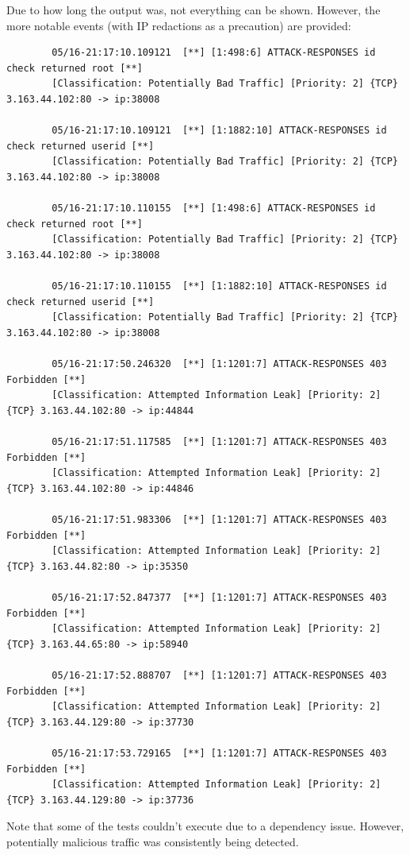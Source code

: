 \documentclass[titlepage]{article}
\begin{document}
        Due to how long the output was, not everything can be shown. However,
        the more notable events (with IP redactions as a precaution) are
        provided:
        \begin{verbatim}
        05/16-21:17:10.109121  [**] [1:498:6] ATTACK-RESPONSES id check returned root [**] 
        [Classification: Potentially Bad Traffic] [Priority: 2] {TCP} 3.163.44.102:80 -> ip:38008

        05/16-21:17:10.109121  [**] [1:1882:10] ATTACK-RESPONSES id check returned userid [**] 
        [Classification: Potentially Bad Traffic] [Priority: 2] {TCP} 3.163.44.102:80 -> ip:38008

        05/16-21:17:10.110155  [**] [1:498:6] ATTACK-RESPONSES id check returned root [**] 
        [Classification: Potentially Bad Traffic] [Priority: 2] {TCP} 3.163.44.102:80 -> ip:38008

        05/16-21:17:10.110155  [**] [1:1882:10] ATTACK-RESPONSES id check returned userid [**] 
        [Classification: Potentially Bad Traffic] [Priority: 2] {TCP} 3.163.44.102:80 -> ip:38008

        05/16-21:17:50.246320  [**] [1:1201:7] ATTACK-RESPONSES 403 Forbidden [**] 
        [Classification: Attempted Information Leak] [Priority: 2] {TCP} 3.163.44.102:80 -> ip:44844

        05/16-21:17:51.117585  [**] [1:1201:7] ATTACK-RESPONSES 403 Forbidden [**] 
        [Classification: Attempted Information Leak] [Priority: 2] {TCP} 3.163.44.102:80 -> ip:44846

        05/16-21:17:51.983306  [**] [1:1201:7] ATTACK-RESPONSES 403 Forbidden [**] 
        [Classification: Attempted Information Leak] [Priority: 2] {TCP} 3.163.44.82:80 -> ip:35350

        05/16-21:17:52.847377  [**] [1:1201:7] ATTACK-RESPONSES 403 Forbidden [**] 
        [Classification: Attempted Information Leak] [Priority: 2] {TCP} 3.163.44.65:80 -> ip:58940

        05/16-21:17:52.888707  [**] [1:1201:7] ATTACK-RESPONSES 403 Forbidden [**] 
        [Classification: Attempted Information Leak] [Priority: 2] {TCP} 3.163.44.129:80 -> ip:37730

        05/16-21:17:53.729165  [**] [1:1201:7] ATTACK-RESPONSES 403 Forbidden [**] 
        [Classification: Attempted Information Leak] [Priority: 2] {TCP} 3.163.44.129:80 -> ip:37736
        \end{verbatim}

        Note that some of the tests couldn't execute due to a dependency issue.
        However, potentially malicious traffic was consistently being detected.
\end{document}
